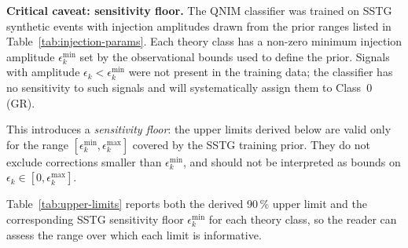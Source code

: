 \documentclass[11pt,a4paper, english]{book}
\theoremstyle{plain}
\theoremstyle{definition}
\numberwithin{equation}{chapter}
\numberwithin{figure}{chapter}
\numberwithin{table}{chapter}
\begin{document}
\noindent\textbf{Critical caveat: sensitivity floor.}
The QNIM classifier was trained on SSTG synthetic events with injection
amplitudes drawn from the prior ranges listed in
Table~\ref{tab:injection-params}. Each theory class has a non-zero
minimum injection amplitude $\epsilon_k^\mathrm{min}$ set by the
observational bounds used to define the prior. Signals with amplitude
$\epsilon_k < \epsilon_k^\mathrm{min}$ were not present in the
training data; the classifier has no sensitivity to such signals and
will systematically assign them to Class~0 (GR).

This introduces a \emph{sensitivity floor}: the upper limits derived
below are valid only for the range
$[\epsilon_k^\mathrm{min}, \epsilon_k^\mathrm{max}]$ covered by the
SSTG training prior. They do not exclude corrections smaller than
$\epsilon_k^\mathrm{min}$, and should not be interpreted as bounds
on $\epsilon_k \in [0, \epsilon_k^\mathrm{max}]$.

Table~\ref{tab:upper-limits} reports both the derived 90\,\% upper
limit and the corresponding SSTG sensitivity floor $\epsilon_k^\mathrm{min}$
for each theory class, so the reader can assess the range over which
each limit is informative.
\end{document}
